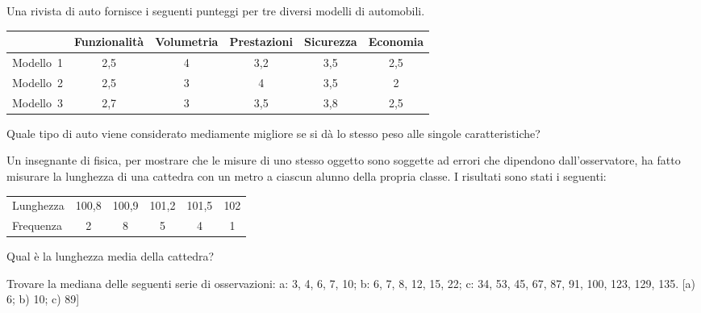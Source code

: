 \begin{esercizio}
\label{ese:A.28}
Una rivista di auto fornisce i seguenti punteggi per tre diversi modelli di 
automobili.
\begin{center}
 \begin{tabular}{l*{5}{c}}
\toprule
 & Funzionalità & Volumetria & Prestazioni & Sicurezza & Economia \\
\midrule
Modello~1 & 2,5 & 4 & 3,2 & 3,5 & 2,5 \\
Modello~2 & 2,5 & 3 & 4 & 3,5 & 2 \\
Modello~3 & 2,7 & 3 & 3,5 & 3,8 & 2,5 \\
\bottomrule
\end{tabular}
\end{center}
Quale tipo di auto viene considerato mediamente migliore se si dà lo stesso 
peso alle singole caratteristiche?
\end{esercizio}

\begin{esercizio}
\label{ese:A.29}
Un insegnante di fisica, per mostrare che le misure di uno stesso oggetto 
sono soggette ad errori che dipendono dall'osservatore,
ha fatto misurare la lunghezza di una cattedra con un metro a ciascun 
alunno della propria classe. I risultati sono stati i seguenti:
\begin{center}
 \begin{tabular}{l*{5}{c}}
\toprule
Lunghezza & 100,8 & 100,9 & 101,2 & 101,5 & 102\\
Frequenza & 2 & 8 & 5 & 4 & 1\\
\bottomrule
\end{tabular}
\end{center}
Qual è la lunghezza media della cattedra?
\end{esercizio}

\begin{esercizio}[\Ast]
\label{ese:A.30}
Trovare la mediana delle seguenti serie di osservazioni:
a: {3, 4, 6, 7, 10}; \quad b: {6, 7, 8, 12, 15, 22}; \quad 
c: {34, 53, 45, 67, 87, 91, 100, 123, 129, 135}. 
\hfill [a) 6; \quad b) 10; \quad c) 89]
\end{esercizio}

